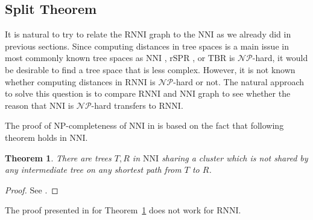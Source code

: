 \documentclass{amsart}
\newcommand{\np}{\mathcal{NP}}
\newcommand{\nni}{\mathrm{NNI}}
\newcommand{\rnni}{\mathrm{RNNI}}
\newcommand{\tbr}{\mathrm{TBR}}
\newcommand{\rspr}{\mathrm{rSPR}}
\newtheorem{theorem}[definition]{Theorem}
\begin{document}
\subsection{Split Theorem}

It is natural to try to relate the $\rnni$ graph to the $\nni$ as we already did in previous sections.
Since computing distances in tree spaces is a main issue in most commonly known tree spaces as $\nni$ \autocite{jiang2000}, $\rspr$ \autocite{Bordewich2005}, or $\tbr$ \autocite{allen2001subtree} is $\np$-hard, it would be desirable to find a tree space that is less complex.
However, it is not known whether computing distances in $\rnni$ is $\np$-hard or not.
The natural approach to solve this question is to compare $\rnni$ and $\nni$ graph to see whether the reason that $\nni$ is $\np$-hard transfers to $\rnni$.

The proof of NP-completeness of $\nni$ in \autocite{jiang2000} is based on the fact that following theorem holds in $\nni$.

\begin{theorem}
	There are trees $T,R$ in $\nni$ sharing a cluster which is not shared by any intermediate tree on any shortest path from $T$ to $R$.
	\label{thm:split_nni}
\end{theorem}

\begin{proof}
	See \autocite{Li1996}.
\end{proof}

The proof presented in \autocite{Li1996} for Theorem~\ref{thm:split_nni} does not work for $\rnni$.
\end{document}
